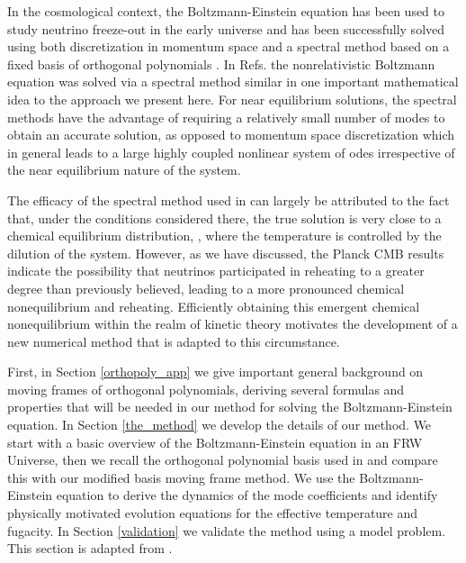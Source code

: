 In the cosmological context, the Boltzmann-Einstein equation has been used to study neutrino freeze-out in the early universe and has been successfully solved using both discretization in momentum space \cite{Hannestad:1995rs,Dolgov:1997mb,Dolgov:1998sf,Gnedin:1997vn,Mangano:2005cc} and a spectral method based on a fixed basis of orthogonal polynomials \cite{Esposito:2000hi,Mangano:2001iu}.    In Refs.\cite{Wilkening,Wilkening2} the nonrelativistic Boltzmann equation was solved via a spectral method similar in  one important mathematical idea to the approach we present here.  For near equilibrium solutions, the spectral methods have the advantage of requiring a relatively small number of modes to obtain an accurate solution, as opposed to momentum space discretization which in general leads to a large highly coupled nonlinear system of odes irrespective of the near equilibrium nature of the system.  

The efficacy of the spectral method used in \cite{Esposito:2000hi,Mangano:2001iu} can largely be attributed to the fact that, under the conditions considered there, the true solution is very close to a chemical equilibrium distribution, , where the temperature is controlled by the dilution of the system. However, as we have discussed, the Planck CMB results \cite{Planck:2013pxb} indicate the possibility that neutrinos participated in reheating to a greater degree than previously believed, leading to a more pronounced chemical nonequilibrium and reheating. Efficiently obtaining this emergent chemical nonequilibrium within the realm of kinetic theory motivates the development of a new numerical method that is adapted to this  circumstance.

 First, in  Section \ref{orthopoly_app}  we give important general background on moving frames of orthogonal polynomials, deriving several formulas and properties that will be needed in our method for solving the Boltzmann-Einstein equation. In Section \ref{the_method} we develop the details of our method. We start with a basic overview of the Boltzmann-Einstein equation in an FRW Universe, then we recall the orthogonal polynomial basis used in \cite{Esposito:2000hi,Mangano:2001iu} and compare this with our modified basis moving frame method.  We use the Boltzmann-Einstein equation to derive the dynamics of the mode coefficients and identify physically motivated evolution equations for the effective temperature and fugacity.  In Section \ref{validation} we validate the method using a model problem.   This section is adapted from \cite{Birrell:2014ona,Birrell:2014gea,Birrell:2014uka}.





